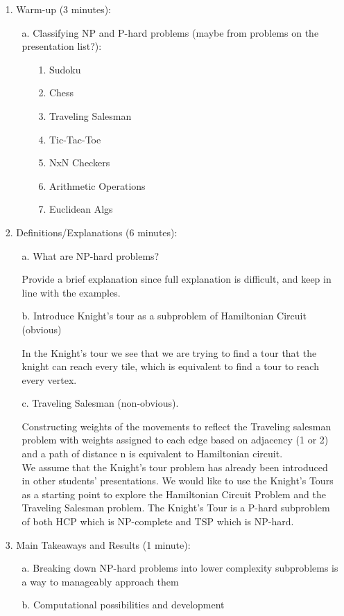 \documentclass[11pt]{article}
\begin{document}
\begin{itemize}
	\item[1.] Warm-up (3 minutes):
		\begin{itemize}
			\item[a.] Classifying NP and P-hard problems (maybe from problems on the presentation list?):
				\begin{itemize}
					\item[1.] Sudoku
					\item[2.] Chess
					\item[3.] Traveling Salesman
					\item[4.] Tic-Tac-Toe
					\item[5.] NxN Checkers
					\item[6.] Arithmetic Operations
					\item[7.] Euclidean Algs
				\end{itemize}
		\end{itemize}
	\item[2.] Definitions/Explanations (6 minutes): 
		\begin{itemize}
			\item[a.] What are NP-hard problems?

				Provide a brief explanation since full explanation is difficult, and keep in line with the examples.


			\item[b.] Introduce Knight’s tour as a subproblem of Hamiltonian Circuit (obvious) 
				
				In the Knight's tour we see that we are trying to find a tour that the knight can reach every tile, which is equivalent to find a tour to reach every vertex.


			\item[c.] Traveling Salesman (non-obvious). 
		
			Constructing weights of the movements to reflect the Traveling salesman problem with weights assigned to each edge based on adjacency (1 or 2) and a path of distance n is equivalent to Hamiltonian circuit.
			\\	

			We assume that the Knight’s tour problem has already been introduced in other students' presentations. We would like to use the Knight’s Tours as a starting point to explore the Hamiltonian Circuit Problem and the Traveling Salesman problem. The Knight’s Tour is a P-hard subproblem of both HCP which is NP-complete and TSP which is NP-hard.

		\end{itemize}
	\item[3.] Main Takeaways and Results (1 minute):
	\begin{itemize}
		\item[a.] Breaking down NP-hard problems into lower complexity subproblems is a way to manageably approach them
		\item[b.] Computational possibilities and development
	\end{itemize}
\end{itemize}
\end{document}
